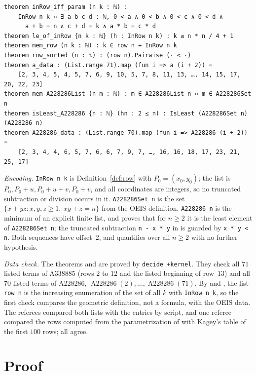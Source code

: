 \documentclass[11pt]{amsart}
\theoremstyle{plain}
\theoremstyle{definition}
\newcommand{\Aa}{\operatorname{A228286}}
\begin{document}
\begin{lstlisting}
theorem inRow_iff_param (n k : ℕ) :
    InRow n k ↔ ∃ a b c d : ℕ, 0 < a ∧ 0 < b ∧ 0 < c ∧ 0 < d ∧
      a + b = n ∧ c + d = k ∧ a * b = c * d
theorem le_of_inRow {n k : ℕ} (h : InRow n k) : k ≤ n * n / 4 + 1
theorem mem_row (n k : ℕ) : k ∈ row n ↔ InRow n k
theorem row_sorted (n : ℕ) : (row n).Pairwise (· < ·)
theorem a_data : (List.range 71).map (fun i => a (i + 2)) =
    [2, 3, 4, 5, 4, 5, 7, 6, 9, 10, 5, 7, 8, 11, 13, …, 14, 15, 17, 20, 22, 23]
theorem mem_A228286List (n m : ℕ) : m ∈ A228286List n ↔ m ∈ A228286Set n
theorem isLeast_A228286 {n : ℕ} (hn : 2 ≤ n) : IsLeast (A228286Set n) (A228286 n)
theorem A228286_data : (List.range 70).map (fun i => A228286 (i + 2)) =
    [2, 3, 4, 4, 6, 5, 7, 6, 6, 7, 9, 7, …, 16, 16, 18, 17, 23, 21, 25, 17]
\end{lstlisting}

\emph{Encoding.} \texttt{InRow n k} is Definition~\ref{def:row} with $P_0=(x_0,y_0)$; the list  is $P_0,P_0+u,P_0+u+v,P_0+v$, and all coordinates are integers, so no truncated subtraction or division occurs in it. \texttt{A228286Set n} is the set $\{x+yz: x,y,z\ge1,\ xy+z=n\}$ from the OEIS definition. \texttt{A228286 n} is the minimum of an explicit finite list, and  proves that for $n\ge2$ it is the least element of \texttt{A228286Set n}; the truncated subtraction \texttt{n - x * y} in  is guarded by \texttt{x * y < n}. Both sequences have offset~$2$, and  quantifies over all $n\ge2$ with no further hypothesis.

\emph{Data check.} The theorems  and  are proved by \texttt{decide +kernel}. They check all $71$ listed terms of A338885 (rows $2$ to $12$ and the listed beginning of row~$13$) and all $70$ listed terms of A228286, $\Aa(2),\dots,\Aa(71)$. By  and , the list \texttt{row n} is the increasing enumeration of the set of all $k$ with \texttt{InRow n k}, so the first check compares the geometric definition, not a formula, with the OEIS data. The referees compared both lists with the entries by script, and one referee compared the rows computed from the parametrization of  with Kagey's table of the first $100$ rows; all agree.

\section{Proof}\label{sec:proof}
\end{document}
